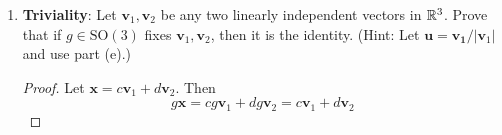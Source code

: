 \documentclass[../psets.tex]{subfiles}
\begin{document}
\begin{enumerate}
\begin{enumerate}
\begin{proof}
\begin{align*}
\begin{pmatrix}
                    0\\
                \end{pmatrix}\\
                &=
                \begin{pmatrix}
                    \mathbf{u}_1 & \mathbf{u}_2 & \mathbf{u}_3\\
                \end{pmatrix}
                \begin{pmatrix}
                    0\\
                    a\\
                    -b\\
                \end{pmatrix}\\
                &= a\mathbf{u}_2-b\mathbf{u}_3
            \end{align*}
            The relabeling $b:=-b$ gives the desired result. The proof of the statement $M\mathbf{u}_3=-b\mathbf{u}_2+a\mathbf{u}_3$ is entirely symmetric.\par
            We define a "rotation about the line $\mathbf{u}$ by angle $\theta$" to be a matrix $M$ which sends every
            \begin{equation*}
                t\mathbf{u}_1+r\cos(\phi)\mathbf{u}_2+r\sin(\phi)\mathbf{u}_3 \mapsto t\mathbf{u}_1+r\cos(\phi-\theta)\mathbf{u}_2+r\sin(\phi-\theta)\mathbf{u}_3
            \end{equation*}
            i.e., which fixes the $\mathbf{u}_1$ component and rotates the $\mathbf{u}_2,\mathbf{u}_3$ component in that perpendicular plane analogously to part (c). Using the same $M=S\mathcal{M}(T)S^{-1}$ trick as above and the argument from part (c), we can clearly see that $M$ is such a matrix.
        \end{proof}
        \item \textbf{Triviality}: Let $\mathbf{v}_1,\mathbf{v}_2$ be any two linearly independent vectors in $\mathbb{R}^3$. Prove that if $g\in\text{SO}(3)$ fixes $\mathbf{v}_1,\mathbf{v}_2$, then it is the identity. (Hint: Let $\mathbf{u}=\mathbf{v_1}/|\mathbf{v}_1|$ and use part (e).)
        \begin{proof}
            Let $\mathbf{x}=c\mathbf{v}_1+d\mathbf{v}_2$. Then
            \begin{equation*}
                g\mathbf{x} = cg\mathbf{v}_1+dg\mathbf{v}_2
                = c\mathbf{v}_1+d\mathbf{v}_2
            \end{equation*}

\end{proof}
\end{enumerate}
\end{enumerate}
\end{document}
